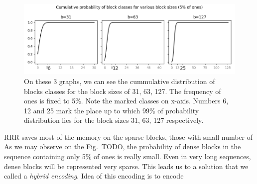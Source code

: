 \begin{figure}
	\centerline{
		\includegraphics[width=\textwidth]{images/hybrid_encoding_motivation}
	}
	\caption[TODO]{On these 3 graphs, we can see the cummulative distribution
    of blocks classes for the block sizes of 31, 63, 127. The frequency of ones is
    fixed to 5\%. Note the marked classes on x-axis. Numbers 6, 12 and
    25 mark the place up to which 99\% of probability distribution lies for
    the block sizes 31, 63, 127 respectively.
	}
	\label{obr:hybridEncodingDistribution}
\end{figure}

RRR saves most of the memory on the sparse blocks, those with small number of
As we may observe on the Fig.~TODO, the probability of dense blocks in the sequence
containing only 5\% of ones is really small. Even in very long sequences, dense blocks
will be represented very sparse. This leads us to a solution that we called a
\textit{hybrid encoding}. Idea of this encoding is to encode 